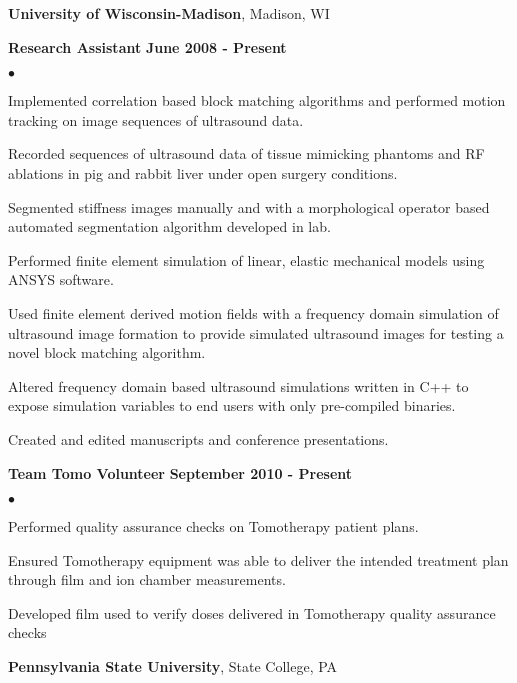 \documentclass[margin,line]{res}
\newenvironment{list2}{
  \begin{list}{$\bullet$}{%
      \setlength{\itemsep}{0in}
      \setlength{\parsep}{0in} \setlength{\parskip}{0in}
      \setlength{\topsep}{0in} \setlength{\partopsep}{0in}
      \setlength{\leftmargin}{0.2in}}}{\end{list}}
\begin{document}
\begin{resume}
{\bf University of Wisconsin-Madison}, Madison, WI

\vspace{-.3cm}
{\bf  Research Assistant} \hfill {\bf June 2008 - Present} \\
\vspace{-.2cm}
\begin{list2}
\item Implemented correlation based block matching algorithms and performed motion tracking on image sequences of ultrasound data.
\item Recorded sequences of ultrasound data of tissue mimicking phantoms and RF ablations in pig and rabbit liver under open surgery conditions.
\item Segmented stiffness images manually and with a morphological operator based automated segmentation algorithm developed in lab. 
\item Performed finite element simulation of linear, elastic mechanical models using ANSYS software.
\item Used finite element derived motion fields with a frequency domain simulation of ultrasound image formation
 to provide simulated ultrasound images for testing a novel block matching algorithm. 
\item Altered frequency domain based ultrasound simulations written in C++ to expose simulation variables to end users with only pre-compiled binaries.
\item Created and edited manuscripts and conference presentations.
\end{list2}

\vspace{.3cm}

{\bf Team Tomo Volunteer} \hfill {\bf September 2010 - Present} \\
\vspace{-.2cm}
\begin{list2}
\item Performed quality assurance checks on Tomotherapy patient plans.
\item Ensured Tomotherapy equipment was able to deliver the intended treatment plan through film and ion chamber measurements.
\item Developed film used to verify doses delivered in Tomotherapy quality assurance checks
\end{list2}

\vspace{.3cm}


{\bf Pennsylvania State University}, State College, PA


\end{resume}
\end{document}
